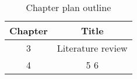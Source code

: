 \begin{table}[h!]
\centering
\begin{tabular}{cc}
{Chapter} & {Title} \\ \midrule
{3} & {Literature review} \\
{4} & 
{5}
{6}
\end{tabular}
\caption{Chapter plan outline}
\label{table:1}
\end{table}
